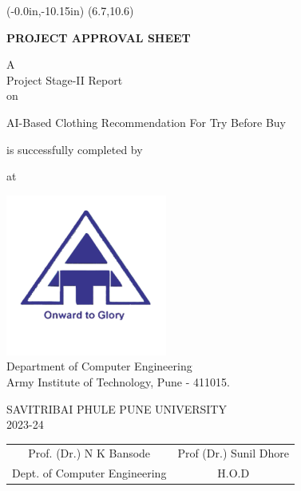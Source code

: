 \thisfancyput(-0.0in,-10.15in){
	\setlength{\unitlength}{1in}
	\framebox(6.7,10.6)
}
\setlength{\parindent}{0mm}
\begin{center}
	\vspace*{0.5 \baselineskip}

	{
		\bfseries
		PROJECT APPROVAL SHEET
		\vspace*{1.5 \baselineskip}
	}
		
	A \\ Project Stage-II Report \\ on
	\vspace*{1.5 \baselineskip}

	AI-Based Clothing Recommendation For Try Before Buy \\
	\vspace*{1.5\baselineskip}

	is successfully completed by
	
	\vspace*{\baselineskip}

	\nametable
	
	\vspace*{\baselineskip}
	
	at

	\vspace*{\baselineskip}

	\includegraphics[scale=0.75]{components/images/logo.png} \\[0.5cm]
	
	Department of Computer Engineering \\
	Army Institute of Technology, Pune - 411015.\\
	\vspace*{0.5\baselineskip}
	
	SAVITRIBAI PHULE PUNE UNIVERSITY \\
	2023-24
\end{center}

\vspace*{3\baselineskip}

\begin{table}[h!]
	\centering
	\begin{tabular}{ c c }
		Prof. (Dr.) N K Bansode \hspace{35mm} & Prof (Dr.) Sunil Dhore \\
		Dept. of Computer Engineering \hspace{35mm} & H.O.D
	\end{tabular}
\end{table}

\pagebreak